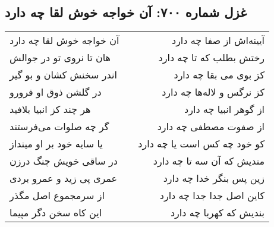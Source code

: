\begin{center}
\section*{غزل شماره ۷۰۰: آن خواجه خوش لقا چه دارد}
\label{sec:0700}
\begin{longtable}{l p{0.5cm} r}
آن خواجه خوش لقا چه دارد
&&
آیینه‌اش از صفا چه دارد
\\
هان تا نروی تو در جوالش
&&
رختش بطلب که تا چه دارد
\\
اندر سخنش کشان و بو گیر
&&
کز بوی می بقا چه دارد
\\
در گلشن ذوق او فرورو
&&
کز نرگس و لاله‌ها چه دارد
\\
هر چند کز انبیا بلافید
&&
از گوهر انبیا چه دارد
\\
گر چه صلوات می‌فرستند
&&
از صفوت مصطفی چه دارد
\\
یا سایه خود بر او مینداز
&&
کو خود چه کس است یا چه دارد
\\
در ساقی خویش چنگ درزن
&&
مندیش که آن سه تا چه دارد
\\
عمری پی زید و عمرو بردی
&&
زین پس بنگر خدا چه دارد
\\
از سرمجموع اصل مگذر
&&
کاین اصل جدا جدا چه دارد
\\
این کاه سخن دگر مپیما
&&
بندیش که کهربا چه دارد
\\
\end{longtable}
\end{center}
